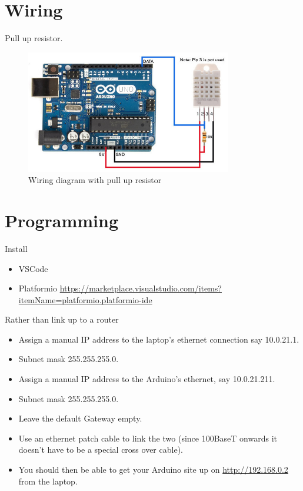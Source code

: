 \documentclass[a4paper, 12pt]{article}
\begin{document}
\section{Wiring}

Pull up resistor.



\begin{figure}[H]
  \centering
  \includegraphics[width=0.8\textwidth]{wiring-dht22.jpg}
  \caption{Wiring diagram with pull up resistor}
\end{figure}


\section{Programming}

Install 

\begin{itemize}
  \item VSCode
  \item Platformio \url{https://marketplace.visualstudio.com/items?itemName=platformio.platformio-ide}
\end{itemize}

Rather than link up to a router

\begin{itemize}
  \item Assign a manual IP address to the laptop's ethernet connection say 10.0.21.1.
  \item Subnet mask 255.255.255.0.
  \item Assign a manual IP address to the Arduino's ethernet, say 10.0.21.211.
  \item Subnet mask 255.255.255.0.
  \item Leave the default Gateway empty.
  \item Use an ethernet patch cable to link the two (since 100BaseT onwards it doesn't have to be a special cross over cable).
  \item You should then be able to get your Arduino site up on \url{http://192.168.0.2} from the laptop.
\end{itemize}
\end{document}
